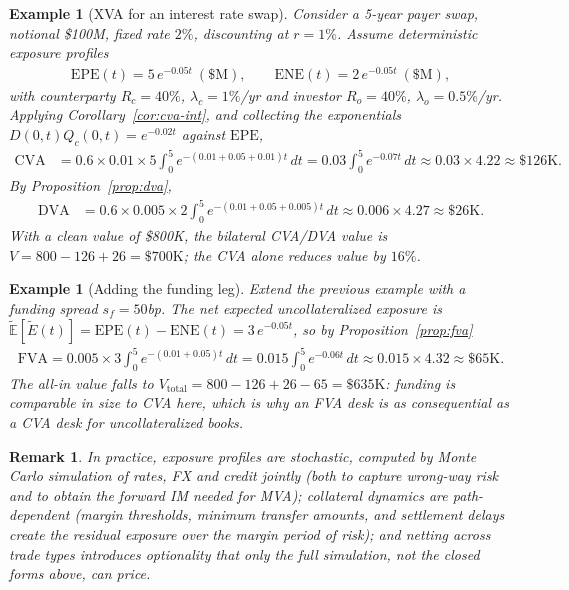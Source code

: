 \documentclass{report}
\theoremstyle{spacedplain}
\theoremstyle{spaceddefinition}
\newtheorem{example}[theorem]{Example}
\theoremstyle{spacedremark}
\newtheorem{remark}[theorem]{Remark}
\begin{document}
\begin{example}[XVA for an interest rate swap]
Consider a 5-year payer swap, notional \$100M, fixed rate $2\%$, discounting at $r=1\%$. Assume deterministic exposure profiles
\begin{align}
    \text{EPE}(t) = 5\,e^{-0.05t}\ (\$\text{M}), \qquad \text{ENE}(t) = 2\,e^{-0.05t}\ (\$\text{M}),
\end{align}
with counterparty $R_c=40\%$, $\lambda_c=1\%$/yr and investor $R_o=40\%$, $\lambda_o=0.5\%$/yr. Applying Corollary~\ref{cor:cva-int}, and collecting the exponentials $D(0,t)Q_c(0,t)=e^{-0.02t}$ against $\text{EPE}$,
\begin{align}
    \text{CVA} &= 0.6\times0.01\times5\int_0^5 e^{-(0.01+0.05+0.01)t}\,dt
    = 0.03\int_0^5 e^{-0.07t}\,dt \approx 0.03\times4.22 \approx \$126\text{K}.
\end{align}
By Proposition~\ref{prop:dva},
\begin{align}
    \text{DVA} &= 0.6\times0.005\times2\int_0^5 e^{-(0.01+0.05+0.005)t}\,dt \approx 0.006\times4.27 \approx \$26\text{K}.
\end{align}
With a clean value of \$800K, the bilateral CVA/DVA value is $V = 800 - 126 + 26 = \$700\text{K}$; the CVA alone reduces value by $16\%$.
\end{example}

\begin{example}[Adding the funding leg]
Extend the previous example with a funding spread $s_f=50$bp. The net expected uncollateralized exposure is $\widetilde{\mathbb{E}}[\widetilde{E}(t)] = \text{EPE}(t)-\text{ENE}(t)=3\,e^{-0.05t}$, so by Proposition~\ref{prop:fva}
\begin{align}
    \text{FVA} = 0.005\times3\int_0^5 e^{-(0.01+0.05)t}\,dt = 0.015\int_0^5 e^{-0.06t}\,dt \approx 0.015\times4.32 \approx \$65\text{K}.
\end{align}
The all-in value falls to $V_{\text{total}} = 800 - 126 + 26 - 65 = \$635\text{K}$: funding is comparable in size to CVA here, which is why an FVA desk is as consequential as a CVA desk for uncollateralized books.
\end{example}

\begin{remark}
In practice, exposure profiles are stochastic, computed by Monte Carlo simulation of rates, FX and credit \emph{jointly} (both to capture wrong-way risk and to obtain the forward IM needed for MVA); collateral dynamics are path-dependent (margin thresholds, minimum transfer amounts, and settlement delays create the residual exposure over the margin period of risk); and netting across trade types introduces optionality that only the full simulation, not the closed forms above, can price.
\end{remark}
\end{document}
